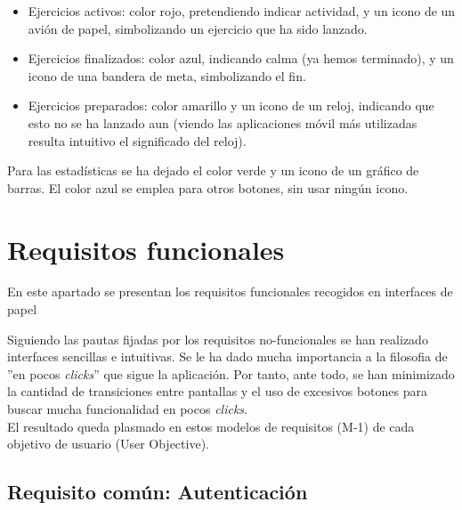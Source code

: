 \begin{itemize}
\item Ejercicios activos: color rojo, pretendiendo indicar actividad, y un icono de un avión de papel, simbolizando un ejercicio que ha sido lanzado.
\item Ejercicios finalizados: color azul, indicando calma (ya hemos terminado), y un icono de una bandera de meta, simbolizando el fin.
\item Ejercicios preparados: color amarillo y un icono de un reloj, indicando que esto no se ha lanzado aun (viendo las aplicaciones móvil más utilizadas resulta intuitivo el significado del reloj).
\end{itemize}

Para las estadísticas se ha dejado el color verde y un icono de un gráfico de barras. El color azul se emplea para otros botones, sin usar ningún icono.\\

\section{Requisitos funcionales}
\label{analisis-de-requisitos:funcionales}

En este apartado se presentan los requisitos funcionales recogidos en interfaces de papel

Siguiendo las pautas fijadas por los requisitos no-funcionales se han realizado interfaces sencillas e intuitivas. Se le ha dado mucha importancia a la filosofia de ''en pocos \textit{clicks}'' que sigue la aplicación. Por tanto, ante todo, se han minimizado la cantidad de transiciones entre pantallas y el uso de excesivos botones para buscar mucha funcionalidad en pocos \textit{clicks}.\\

El resultado queda plasmado en estos modelos de requisitos (M-1) de cada objetivo de usuario (User Objective).\\

\subsection{Requisito común: Autenticación}
\label{analisis-de-requisitos:funcionales:p1}

